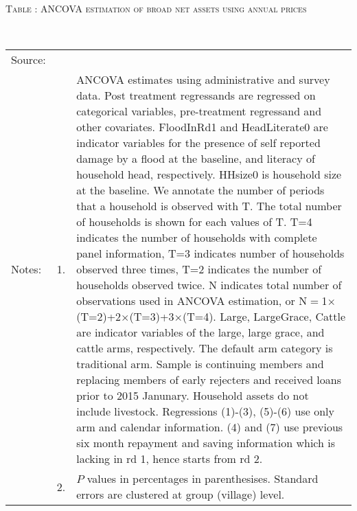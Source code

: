 \hspace{-1cm}\begin{minipage}[t]{14cm}
\hfil\textsc{\normalsize Table \thetable: ANCOVA estimation of broad net assets using annual prices \label{tab ANCOVA net assets}}\\
\setlength{\tabcolsep}{1pt}
\setlength{\baselineskip}{8pt}
\renewcommand{\arraystretch}{.55}
\hfil{}\\
\renewcommand{\arraystretch}{.8}
\setlength{\tabcolsep}{1pt}
\begin{tabular}{>{\hfill\scriptsize}p{1cm}<{}>{\hfill\scriptsize}p{.25cm}<{}>{\scriptsize}p{12cm}<{\hfill}}
Source:& \multicolumn{2}{l}{\scriptsize Estimated with GUK administrative and survey data.}\\
Notes: & 1. & ANCOVA estimates using administrative and survey data. Post treatment regressands are regressed on categorical variables, pre-treatment regressand and other covariates. \textsf{FloodInRd1} and \textsf{HeadLiterate0} are indicator variables for the presence of self reported damage by a flood at the baseline, and literacy of household head, respectively. \textsf{HHsize0} is household size at the baseline. We annotate the number of periods that a household is observed with \textsf{T}. The total number of households is shown for each values of \textsf{T}. \textsf{T=4} indicates the number of households with complete panel information, \textsf{T=3} indicates number of households observed three times, \textsf{T=2} indicates the number of households observed twice. \textsf{N} indicates total number of observations used in ANCOVA estimation, or \textsf{N$=$1$\times$(T=2)+2$\times$(T=3)+3$\times$(T=4)}.  \textsf{Large}, \textsf{LargeGrace}, \textsf{Cattle} are indicator variables of the \textsf{large}, \textsf{large grace}, and \textsf{cattle} arms, respectively. The default arm category is \textsf{traditional} arm. Sample is continuing members and replacing members of early rejecters and received loans prior to 2015 Janunary. Household assets do not include livestock. Regressions (1)-(3), (5)-(6) use only arm and calendar information. (4) and (7) use previous six month repayment and saving information which is lacking in rd 1, hence starts from rd 2.\\
& 2. & $P$ values in percentages in parenthesises. Standard errors are clustered at group (village) level.
\end{tabular}
\end{minipage}

